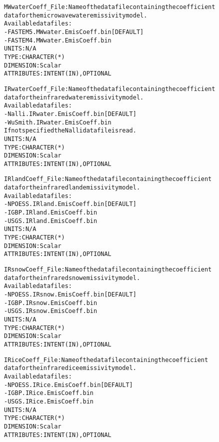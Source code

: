 \begin{alltt}
        MWwaterCoeff_File:  Name of the data file containing the coefficient
                            data for the microwave water emissivity model.
                            Available datafiles:
                            - FASTEM5.MWwater.EmisCoeff.bin  [DEFAULT]
                            - FASTEM4.MWwater.EmisCoeff.bin
                            UNITS:      N/A
                            TYPE:       CHARACTER(*)
                            DIMENSION:  Scalar
                            ATTRIBUTES: INTENT(IN), OPTIONAL
 
        IRwaterCoeff_File:  Name of the data file containing the coefficient
                            data for the infrared water emissivity model.
                            Available datafiles:
                            - Nalli.IRwater.EmisCoeff.bin  [DEFAULT]
                            - WuSmith.IRwater.EmisCoeff.bin
                            If not specified the Nalli datafile is read.
                            UNITS:      N/A
                            TYPE:       CHARACTER(*)
                            DIMENSION:  Scalar
                            ATTRIBUTES: INTENT(IN), OPTIONAL
 
        IRlandCoeff_File:   Name of the data file containing the coefficient
                            data for the infrared land emissivity model.
                            Available datafiles:
                            - NPOESS.IRland.EmisCoeff.bin  [DEFAULT]
                            - IGBP.IRland.EmisCoeff.bin
                            - USGS.IRland.EmisCoeff.bin
                            UNITS:      N/A
                            TYPE:       CHARACTER(*)
                            DIMENSION:  Scalar
                            ATTRIBUTES: INTENT(IN), OPTIONAL
 
        IRsnowCoeff_File:   Name of the data file containing the coefficient
                            data for the infrared snow emissivity model.
                            Available datafiles:
                            - NPOESS.IRsnow.EmisCoeff.bin  [DEFAULT]
                            - IGBP.IRsnow.EmisCoeff.bin
                            - USGS.IRsnow.EmisCoeff.bin
                            UNITS:      N/A
                            TYPE:       CHARACTER(*)
                            DIMENSION:  Scalar
                            ATTRIBUTES: INTENT(IN), OPTIONAL
 
        IRiceCoeff_File:    Name of the data file containing the coefficient
                            data for the infrared ice emissivity model.
                            Available datafiles:
                            - NPOESS.IRice.EmisCoeff.bin  [DEFAULT]
                            - IGBP.IRice.EmisCoeff.bin
                            - USGS.IRice.EmisCoeff.bin
                            UNITS:      N/A
                            TYPE:       CHARACTER(*)
                            DIMENSION:  Scalar
                            ATTRIBUTES: INTENT(IN), OPTIONAL
 

\end{alltt}
